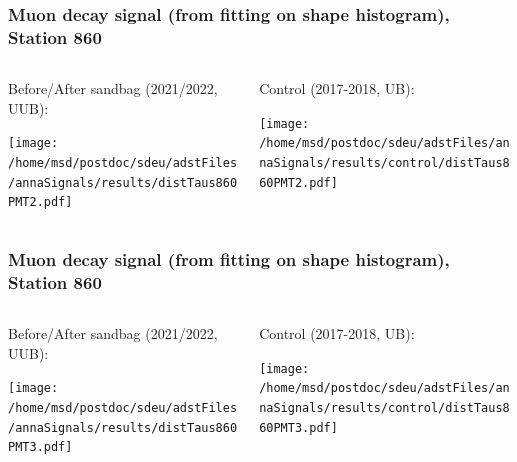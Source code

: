 \documentclass[aspectratio=169]{beamer}
\begin{document}
\begin{frame}
  \frametitle{Muon decay signal (from fitting on shape histogram), Station 860}
  
  \begin{columns}[T,c]
    \begin{column}{.5\textwidth}
      Before/After sandbag (2021/2022, UUB):
      \vspace{.3cm}

      \texttt{[image: /home/msd/postdoc/sdeu/adstFiles/annaSignals/results/distTaus860PMT2.pdf]}
    \end{column}
    \begin{column}{.5\textwidth}
      Control (2017-2018, UB):
      \vspace{0.3cm}

      \texttt{[image: /home/msd/postdoc/sdeu/adstFiles/annaSignals/results/control/distTaus860PMT2.pdf]}
    \end{column}    
\end{columns}
\end{frame}

\begin{frame}
  \frametitle{Muon decay signal (from fitting on shape histogram), Station 860}
  
  \begin{columns}[T,c]
    \begin{column}{.5\textwidth}
      Before/After sandbag (2021/2022, UUB):
      \vspace{.3cm}

      \texttt{[image: /home/msd/postdoc/sdeu/adstFiles/annaSignals/results/distTaus860PMT3.pdf]}
    \end{column}
    \begin{column}{.5\textwidth}
      Control (2017-2018, UB):
      \vspace{0.3cm}

      \texttt{[image: /home/msd/postdoc/sdeu/adstFiles/annaSignals/results/control/distTaus860PMT3.pdf]}
    \end{column}    
\end{columns}
\end{frame}

\end{document}
